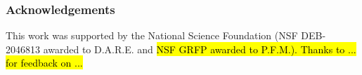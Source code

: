 \documentclass[11pt]{article}
\begin{document}
\subsubsection{Acknowledgements}
This work was supported by the National Science Foundation 
(NSF DEB-2046813 awarded to D.A.R.E. and \hl{NSF GRFP awarded 
to P.F.M.). Thanks to ... for feedback on ...}









\end{document}
